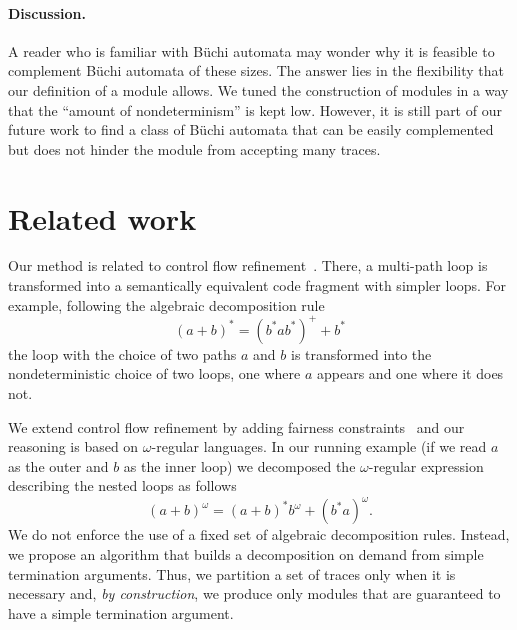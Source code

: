 \paragraph{Discussion.} 
A reader who is familiar with Büchi automata may wonder why it is feasible to complement Büchi automata of these sizes. 
The answer lies in the flexibility that our definition of a module allows. 
We tuned the construction of modules in a way that the ``amount of nondeterminism'' is kept low.
However, it is still part of our future work to find a class of Büchi automata that can be easily complemented but does not hinder the module from accepting many traces. 

























\section{Related work}
Our method is related to control flow refinement~\cite{pldi/GulwaniJK09}. There, a multi-path
loop is transformed into a semantically equivalent code fragment with simpler loops.
For example, following the algebraic decomposition rule \[
(a+b)^*=(b^*ab^*)^+ + b^*
\]
the loop with the choice of two paths $a$ and $b$ is
transformed into the nondeterministic choice of two loops, one where
$a$ appears and one where it does not.

We extend control flow refinement by adding fairness
constraints~\cite{apal/Vardi91} and our reasoning is based on $\omega$-regular languages.  In
our running example (if we read $a$ as the outer and $b$ as the inner loop) we
decomposed the $\omega$-regular expression describing the nested loops
as follows $$(a+b)^\omega = (a+b)^* b^\omega + (b^*a)^\omega.$$ 
We do not enforce the use of a fixed set of algebraic decomposition rules.  
Instead, we propose an algorithm that builds a decomposition on demand
from simple termination arguments.
Thus, we partition a set of traces only when it is necessary and,  \emph{by construction}, we
produce only modules that are guaranteed to have a simple termination argument.


